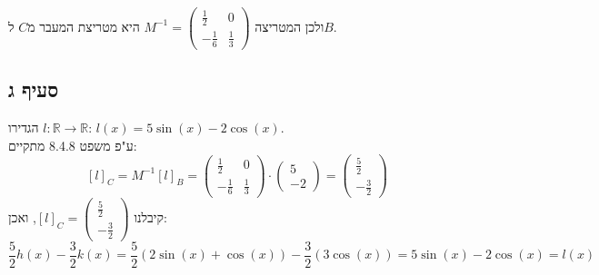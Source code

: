 \documentclass{article}
\def\reals{\mathbb{R}}
\begin{document}
ולכן המטריצה $M^{-1}=\begin{pmatrix}
        \frac{1}{2}  & 0           \\
        -\frac{1}{6} & \frac{1}{3}
    \end{pmatrix}$ היא מטריצת המעבר מ$C$ ל$B$.

\pagebreak

\subsection*{סעיף ג}

הגדירו $l: \reals \rightarrow \reals$: $l(x)=5\sin(x)-2\cos(x)$. \\
ע"פ משפט 8.4.8 מתקיים:
\[
    [l]_C=M^{-1}[l]_B =\begin{pmatrix}
        \frac{1}{2}  & 0           \\
        -\frac{1}{6} & \frac{1}{3}
    \end{pmatrix}\cdot \begin{pmatrix}
        5 \\
        -2
    \end{pmatrix}=
    \begin{pmatrix}
        \frac{5}{2} \\
        -\frac{3}{2}
    \end{pmatrix}
\]
קיבלנו $[l]_C=\begin{pmatrix}
        \frac{5}{2} \\
        -\frac{3}{2}
    \end{pmatrix}$, ואכן:
\[
    \frac{5}{2}h(x)-\frac{3}{2}k(x)=
    \frac{5}{2}(2\sin(x)+\cos(x))-\frac{3}{2}(3 \cos(x))=
    5\sin(x)-2\cos(x)=l(x)
\]
\end{document}
